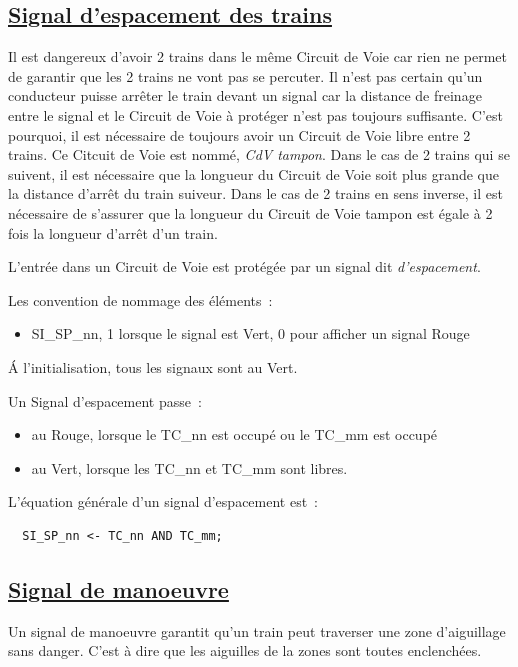 \subsection{\underline{Signal d'espacement des trains}}
\label{sec:esp}

Il est dangereux d'avoir 2 trains dans le même Circuit de Voie car
rien ne permet de garantir que les 2 trains ne vont pas se
percuter. Il n'est pas certain qu'un conducteur puisse arrêter le
train devant un signal car la distance de freinage entre le signal et
le Circuit de Voie à protéger n'est pas toujours suffisante. C'est
pourquoi, il est nécessaire de toujours avoir un Circuit de Voie libre
entre 2 trains. Ce Citcuit de Voie est nommé, \emph{CdV tampon}.  Dans
le cas de 2 trains qui se suivent, il est nécessaire que la longueur
du Circuit de Voie soit plus grande que la distance d'arrêt du train
suiveur.  Dans le cas de 2 trains en sens inverse, il est nécessaire
de s'assurer que la longueur du Circuit de Voie tampon est égale à 2
fois la longueur d'arrêt d'un train.

L'entrée dans un Circuit de Voie est protégée par un signal dit
\emph{d'espacement}.

Les convention de nommage des éléments~:
\begin{itemize}
\item SI\_SP\_nn, 1 lorsque le signal est Vert, 0 pour afficher un
  signal Rouge
\end{itemize}

\'A l'initialisation, tous les signaux sont au Vert.

Un Signal d'espacement passe~:
\begin{itemize}
\item au Rouge, lorsque le TC\_nn est occupé ou le TC\_mm est occupé
\item au Vert, lorsque les TC\_nn et TC\_mm sont libres.
\end{itemize}

\medskip
L'équation générale d'un signal d'espacement est~:
\begin{lstlisting}
  SI_SP_nn <- TC_nn AND TC_mm;
\end{lstlisting}


\subsection{\underline{Signal de manoeuvre}}
\label{sec:esp}

Un signal de manoeuvre garantit qu'un train peut traverser une zone
d'aiguillage sans danger. C'est à dire que les aiguilles de la zones
sont toutes enclenchées.




